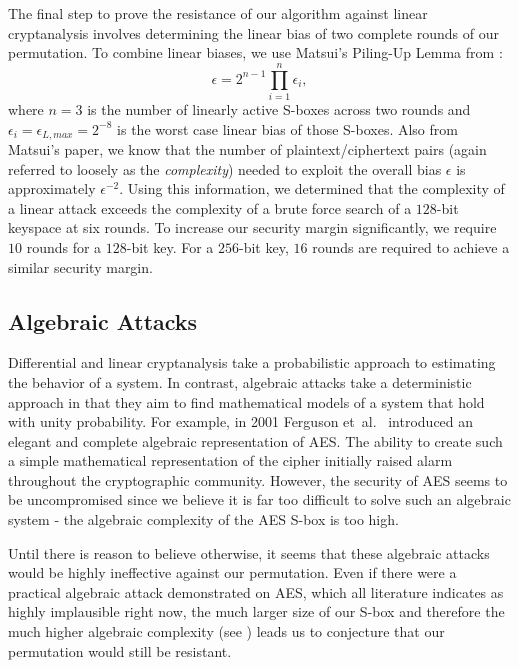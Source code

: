 The final step to prove the resistance of our algorithm against linear cryptanalysis involves determining the linear bias of two complete rounds of our permutation.
To combine linear biases, we use Matsui's Piling-Up Lemma from \cite{Matsui1993_Linear}:
\begin{equation*}
\epsilon = 2^{n-1} \prod\limits_{i = 1}^n \epsilon_i,
\end{equation*}
where $n = 3$ is the number of linearly active S-boxes across two rounds and $\epsilon_i = \epsilon_{L,max} = 2^{-8}$ is the worst case linear bias of those S-boxes.
Also from Matsui's paper, we know that the number of plaintext/ciphertext pairs (again referred to loosely as the \emph{complexity}) needed to exploit the overall bias $\epsilon$ is approximately $\epsilon^{-2}$.
Using this information, we determined that the complexity of a linear attack exceeds the complexity of a brute force search of a $128$-bit keyspace at six rounds.
To increase our security margin significantly, we require $10$ rounds for a $128$-bit key.
For a $256$-bit key, $16$ rounds are required to achieve a similar security margin.

\subsection{Algebraic Attacks}
Differential and linear cryptanalysis take a probabilistic approach to estimating the behavior of a system.
In contrast, algebraic attacks take a deterministic approach in that they aim to find mathematical models of a system that hold with unity probability.
For example, in 2001 Ferguson et~al.\ \cite{Ferguson2001_AlgebraicRijndael} introduced an elegant and complete algebraic representation of AES.
The ability to create such a simple mathematical representation of the cipher initially raised alarm throughout the cryptographic community.
However, the security of AES seems to be uncompromised since we believe it is far too difficult to solve such an algebraic system - the algebraic complexity of the AES S-box is too high.

Until there is reason to believe otherwise, it seems that these algebraic attacks would be highly ineffective against our permutation.
Even if there were a practical algebraic attack demonstrated on AES, which all literature indicates as highly implausible right now, the much larger size of our S-box and therefore the much higher algebraic complexity (see \cite{Wood2013_SboxThesis}) leads us to conjecture that our permutation would still be resistant.

